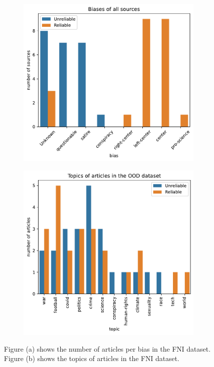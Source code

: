 \begin{figure}[H]
    \centering
    \begin{subfigure}{.5\textwidth}
      \centering
      \includegraphics[width=\linewidth]{obrazky-figures/test_dataset_bias_all.pdf}
      \caption{}
      \label{fig:test_dataset_biases}
    \end{subfigure}%
    \begin{subfigure}{.5\textwidth}
      \centering
      \includegraphics[width=\linewidth]{obrazky-figures/test_dataset_topics.pdf}
      \caption{}
      \label{fig:test_dataset_topics}
    \end{subfigure}
    \caption{Figure (a) shows the number of articles per bias in the FNI dataset. Figure (b) shows the topics of articles in the FNI dataset.}
    \label{fig:test4}
\end{figure}

